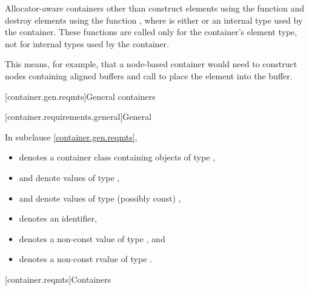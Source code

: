 \pnum
Allocator-aware containers
other than  construct elements using the function
and destroy elements using the function
,
where  is either  or
an internal type used by the container.
These functions are called only for the
container's element type, not for internal types used by the container.
\begin{note}
This
means, for example, that a node-based container would need to construct nodes containing
aligned buffers and call  to place the element into the buffer.
\end{note}

[container.gen.reqmts]{General containers}

[container.requirements.general]{General}

\pnum
In subclause \ref{container.gen.reqmts},
\begin{itemize}
\item
{} denotes a container class containing objects of type ,
\item
{} and  denote values of type ,
\item
{} and  denote values of type (possibly const) ,
\item
{} denotes an identifier,
\item
{} denotes a non-const value of type , and
\item
{} denotes a non-const rvalue of type .
\end{itemize}

[container.reqmts]{Containers}

\newcommand{\indexcont}[1]{%
\indexlibrarymisc{#1}{containers}%
\indexlibrarymemberx{array}{#1}%
\indexlibrarymemberx{deque}{#1}%
\indexlibrarymemberx{forward_list}{#1}%
\indexlibrarymemberx{list}{#1}%
\indexlibrarymemberx{vector}{#1}%
\indexlibrarymemberx{map}{#1}%
\indexlibrarymemberx{set}{#1}%
\indexlibrarymemberx{multiset}{#1}%
\indexlibrarymemberx{multimap}{#1}%
\indexlibrarymemberx{unordered_map}{#1}%
\indexlibrarymemberx{unordered_set}{#1}%
\indexlibrarymemberx{unordered_multiset}{#1}%
\indexlibrarymemberx{unordered_multimap}{#1}%
}

